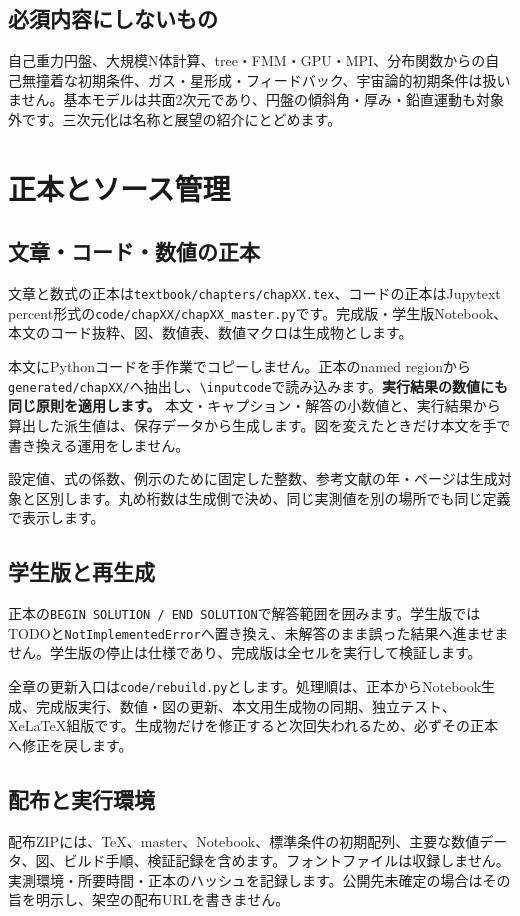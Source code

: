 \documentclass[10pt,openany]{book}
\begin{document}
\subsection{必須内容にしないもの}
自己重力円盤、大規模N体計算、tree・FMM・GPU・MPI、分布関数からの自己無撞着な初期条件、ガス・星形成・フィードバック、宇宙論的初期条件は扱いません。基本モデルは共面2次元であり、円盤の傾斜角・厚み・鉛直運動も対象外です。三次元化は名称と展望の紹介にとどめます。


\section{正本とソース管理}
\subsection{文章・コード・数値の正本}
文章と数式の正本は\texttt{textbook/chapters/chapXX.tex}、コードの正本はJupytext percent形式の\texttt{code/chapXX/chapXX\_master.py}です。完成版・学生版Notebook、本文のコード抜粋、図、数値表、数値マクロは生成物とします。

本文にPythonコードを手作業でコピーしません。正本のnamed regionから\texttt{generated/chapXX/}へ抽出し、\verb|\inputcode|で読み込みます。\textbf{実行結果の数値にも同じ原則を適用します。} 本文・キャプション・解答の小数値と、実行結果から算出した派生値は、保存データから生成します。図を変えたときだけ本文を手で書き換える運用をしません。

設定値、式の係数、例示のために固定した整数、参考文献の年・ページは生成対象と区別します。丸め桁数は生成側で決め、同じ実測値を別の場所でも同じ定義で表示します。
\subsection{学生版と再生成}
正本の\texttt{BEGIN SOLUTION / END SOLUTION}で解答範囲を囲みます。学生版ではTODOと\texttt{NotImplementedError}へ置き換え、未解答のまま誤った結果へ進ませません。学生版の停止は仕様であり、完成版は全セルを実行して検証します。

全章の更新入口は\texttt{code/rebuild.py}とします。処理順は、正本からNotebook生成、完成版実行、数値・図の更新、本文用生成物の同期、独立テスト、XeLaTeX組版です。生成物だけを修正すると次回失われるため、必ずその正本へ修正を戻します。
\subsection{配布と実行環境}
配布ZIPには、TeX、master、Notebook、標準条件の初期配列、主要な数値データ、図、ビルド手順、検証記録を含めます。フォントファイルは収録しません。実測環境・所要時間・正本のハッシュを記録します。公開先未確定の場合はその旨を明示し、架空の配布URLを書きません。
\end{document}

